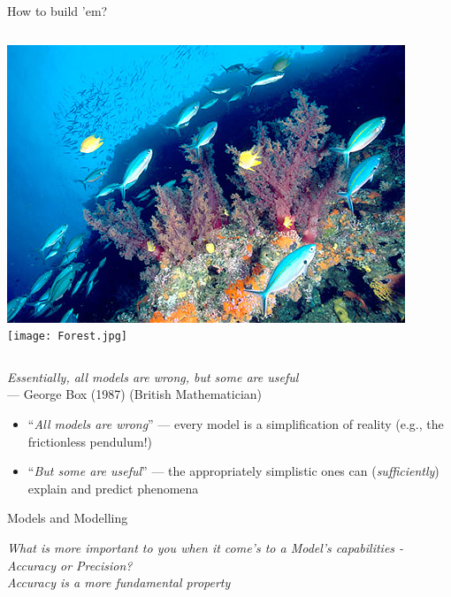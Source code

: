 \documentclass[xcolor=x11names,compress]{beamer}
\renewcommand{\(}{\begin{columns}}
\renewcommand{\)}{\end{columns}}
\newcommand{\<}[1]{\begin{column}{#1}}
\renewcommand{\>}{\end{column}}
\begin{document}
\begin{frame}{How to build 'em?}

	\begin{columns}[c]
	  \column{2.3in}
		\includegraphics[width=\textwidth]{Reef.jpg}
	  \column{2.3in}
		\texttt{[image: Forest.jpg]}
	  \end{columns}
	
	  \begin{center}
		{\it Essentially, all models are wrong, but some are useful}\\--- 
		{\small George Box (1987) (British Mathematician)}
	  \end{center}
	
	  \pause
	  \begin{itemize}[<+->] \itemsep6pt
		\item ``{\it All models are wrong}'' --- every model is a 
		  simplification of reality (e.g., the frictionless pendulum!)
	
		\item ``{\it But some are useful}'' --- the appropriately simplistic 
		  ones can ({\it sufficiently}) explain and predict phenomena
	  \end{itemize}
	
\end{frame}

\begin{frame}{Models and Modelling}

	\begin{center}

		\it What is more important to you when it come's to a Model's capabilities - Accuracy or Precision?\\
		\vspace{20pt}
		\pause 
		Accuracy is a more fundamental property
		
	  \end{center}
 
 \end{frame}
\end{document}
